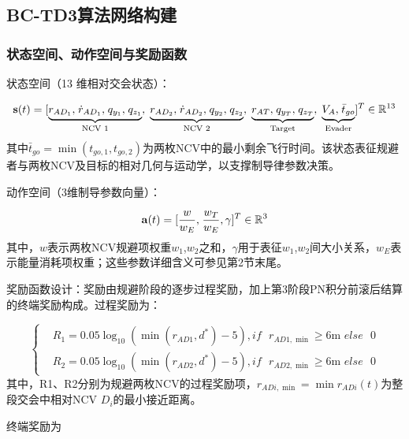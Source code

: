 \subsection{BC-TD3算法网络构建}
\subsubsection{状态空间、动作空间与奖励函数}
状态空间（13 维相对交会状态）：

\begin{equation}
\label{eq:72}
{\mathbf{s}}(t) = {[\underbrace {{r_{A{D_1}}},{\kern 1pt} {{\dot r}_{A{D_1}}},{\kern 1pt} {q_{{y_1}}},{\kern 1pt} {q_{{z_1}}}}_{{\text{NCV 1}}},\;\underbrace {{r_{A{D_2}}},{\kern 1pt} {{\dot r}_{A{D_2}}},{\kern 1pt} {q_{{y_2}}},{\kern 1pt} {q_{{z_2}}}}_{{\text{NCV 2}}},\;\underbrace {{r_{AT}},{\kern 1pt} {q_{{y_T}}},{\kern 1pt} {q_{{z_T}}}}_{{\text{Target}}},\;\underbrace {{V_A},{\kern 1pt} \bar{t}_{go}}_{{\text{Evader}}}]^T} \in {\mathbb{R}^{13}}
\end{equation}
其中$\bar{t}_{go} = \min ({t_{go,1}},{t_{go,2}})$为两枚NCV中的最小剩余飞行时间。该状态表征规避者与两枚NCV及目标的相对几何与运动学，以支撑制导律参数决策。

动作空间（3维制导参数向量）：

\begin{equation}
\label{eq:73}
{\mathbf{a}}(t) = {[\frac{w}{{{w_E}}},{\kern 1pt} \frac{{{w_T}}}{{{w_E}}},\gamma ]^T} \in {\mathbb{R}^3}
\end{equation}
其中，$w$表示两枚NCV规避项权重${w_1}$,${w_2}$之和，$\gamma $用于表征${w_1}$,${w_2}$间大小关系，${w_E}$表示能量消耗项权重；这些参数详细含义可参见第2节末尾。

奖励函数设计：奖励由规避阶段的逐步过程奖励，加上第3阶段PN积分前滚后结算的终端奖励构成。过程奖励为：

\begin{equation}
\label{eq:74}
\left\{
\begin{aligned}
& {R_1} = 0.05{\log _{10}}(\min ({r_{AD1}},{d^*}) - 5),if{\text{ }}{r_{AD1,\min }} \geqslant 6{\text{m }}else{\text{ }}0 \\
& {R_2} = 0.05{\log _{10}}(\min ({r_{AD2}},{d^*}) - 5),if{\text{ }}{r_{AD2,\min }} \geqslant 6{\text{m }}else{\text{ }}0
\end{aligned}
\right.
\end{equation}
其中，R1、R2分别为规避两枚NCV的过程奖励项，${r_{ADi,\min }} = \min {r_{ADi}}(t)$为整段交会中相对NCV ${D_i}$的最小接近距离。

终端奖励为

